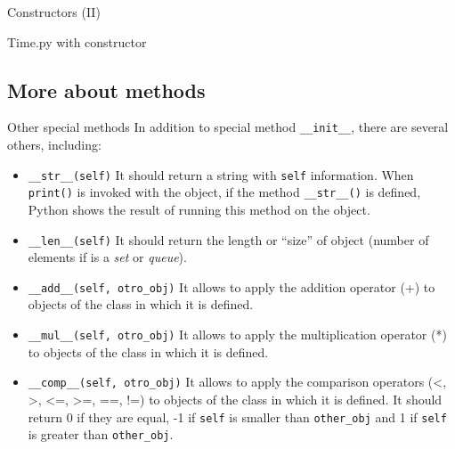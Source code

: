 \documentclass[10pt,compress]{beamer} %
\begin{document}
\begin{frame}[plain]{Constructors (II)}
	\vspace{-0.3cm}
	\begin{block}{Time.py with constructor}
	\vspace{-0.3cm}
		
	\end{block}
\end{frame}

\subsection{More about methods}

\begin{frame}{Other special methods}
In addition to special method \texttt{\_\_init\_\_}, there are several others, including:\\
	\begin{block}{}
		\vspace{-0.15cm}
		\begin{itemize}
		\item \footnotesize{\texttt{\_\_str\_\_(self)} It should return a string with \texttt{self} information.  When \texttt{print()} is invoked with the object, if the method \texttt{\_\_str\_\_()} is defined, Python shows the result of running this method on the object.}
		\item \footnotesize{\texttt{\_\_len\_\_(self)} It should return the length or ``size'' of object (number of elements if is a \textit{set} or \textit{queue}).}
		\item \footnotesize{\texttt{\_\_add\_\_(self, otro\_obj)} It allows to apply the addition operator (+) to objects of the class in which it is defined.}
		\item \footnotesize{\texttt{\_\_mul\_\_(self, otro\_obj)} It allows to apply the multiplication operator (*) to objects of the class in which it is defined.}
		\item \footnotesize{\texttt{\_\_comp\_\_(self, otro\_obj)} It allows to apply the comparison operators (<, >, <=, >=, ==, !=) to objects of the class in which it is defined. It should return 0 if they are equal, -1 if \texttt {self} is smaller than \texttt{other\_obj} and 1 if \texttt{self} is greater than \texttt{other\_obj}.}
		\end{itemize}
		\vspace{-0.2cm}
	\end{block}	
\end{frame}
\end{document}
